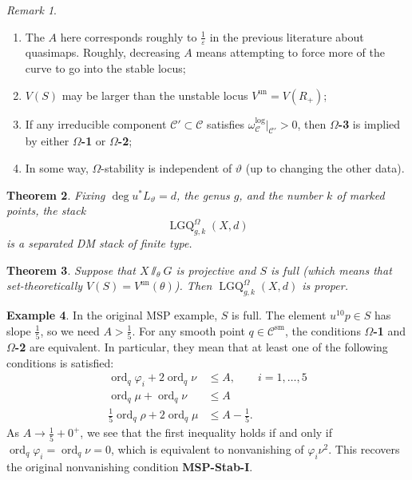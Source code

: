 \documentclass[10pt]{amsart}
\newtheorem{thm}{Theorem}[section]
\theoremstyle{definition}
\newtheorem{exm}[thm]{Example}
\theoremstyle{remark}
\newtheorem{rmk}[thm]{Remark}
\theoremstyle{plain}
\theoremstyle{definition}
\theoremstyle{remark}
\newcommand{\ep}{\varepsilon}
\newcommand{\mc}[1]{\mathcal{#1}}
\newcommand{\mr}[1]{\mathrm{#1}}
\newcommand{\on}[1]{\operatorname{#1}}
\newcommand{\1}{\mathbf{1}}
\newcommand{\2}{\mathbf{2}}
\newcommand{\3}{\mathbf{3}}
\begin{document}
\begin{rmk}\leavevmode
    \begin{enumerate}
        \item The $A$ here corresponds roughly to $\frac{1}{\ep}$ in the previous literature about quasimaps. Roughly, decreasing $A$ means attempting to force more of the curve to go into the stable locus;
        \item $V(S)$ may be larger than the unstable locus $V^{\on{un}} = V(R_+)$;
        \item If any irreducible component $\mc{C}' \subset \mc{C}$ satisfies $\omega_{\mc{C}}^{\log}|_{\mc{C}'} > 0$, then \textbf{$\Omega$-3} is implied by either \textbf{$\Omega$-1} or \textbf{$\Omega$-2};
        \item In some way, $\Omega$-stability is independent of $\vartheta$ (up to changing the other data).
    \end{enumerate}
\end{rmk}

\begin{thm}
    Fixing $\deg u^*L_{\vartheta} = d$, the genus $g$, and the number $k$ of marked points, the stack
    \[ \on{LGQ}^{\Omega}_{g,k}(X,d) \]
    is a separated DM stack of finite type.
\end{thm}

\begin{thm}
    Suppose that $X \sslash_{\theta} G$ is projective and $S$ is \textit{full} (which means that set-theoretically $V(S) = V^{\on{un}}(\theta)$). Then $\on{LGQ}^{\Omega}_{g,k}(X,d)$ is proper.
\end{thm}

\begin{exm}
    In the original MSP example, $S$ is full. The element $u^{10}p \in S$ has slope $\frac{1}{5}$, so we need $A > \frac{1}{5}$. For any smooth point $q \in \mc{C}^{\mr{sm}}$, the conditions \textbf{$\Omega$-1} and \textbf{$\Omega$-2} are equivalent. In particular, they mean that at least one of the following conditions is satisfied:
    \begin{align*}
        \on{ord}_q \varphi_i + 2 \on{ord}_q \nu &\leq A, \qquad i = 1,\ldots,5 \\
        \on{ord}_q \mu + \on{ord}_q \nu &\leq A \\
        \frac{1}{5} \on{ord}_q \rho + 2 \on{ord}_q \mu &\leq A - \frac{1}{5}.
    \end{align*}
    As $A \to \frac{1}{5} + 0^+$, we see that the first inequality holds if and only if $\on{ord}_q \varphi_i = \on{ord}_q \nu = 0$, which is equivalent to nonvanishing of $\varphi_i \nu^2$. This recovers the original nonvanishing condition \textbf{MSP-Stab-I}.
\end{exm}
\end{document}
